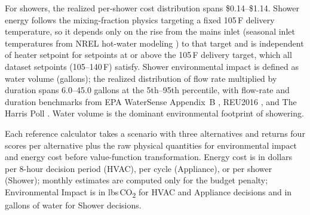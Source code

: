 \documentclass[final,3p,times]{elsarticle}
\begin{document}
For showers, the realized per-shower cost distribution spans \$0.14--\$1.14. Shower energy follows the mixing-fraction physics targeting a fixed 105\,\textdegree{}F delivery temperature, so it depends only on the rise from the mains inlet (seasonal inlet temperatures from NREL hot-water modeling \cite{burch2007}) to that target and is independent of heater setpoint for setpoints at or above the 105\,\textdegree{}F delivery target, which all dataset setpoints (105--140\,\textdegree{}F) satisfy. Shower environmental impact is defined as water volume (gallons); the realized distribution of flow rate multiplied by duration spans 6.0--45.0 gallons at the 5th--95th percentile, with flow-rate and duration benchmarks from EPA WaterSense Appendix~B \cite{epawatersense}, REU2016 \cite{reu2016}, and The Harris Poll \cite{harrispoll2024}. Water volume is the dominant environmental footprint of showering.

Each reference calculator takes a scenario with three alternatives and returns four scores per alternative plus the raw physical quantities for environmental impact and energy cost before value-function transformation. Energy cost is in dollars per 8-hour decision period (HVAC), per cycle (Appliance), or per shower (Shower); monthly estimates are computed only for the budget penalty; Environmental Impact is in lbs\,CO\textsubscript{2} for HVAC and Appliance decisions and in gallons of water for Shower decisions.
\end{document}
